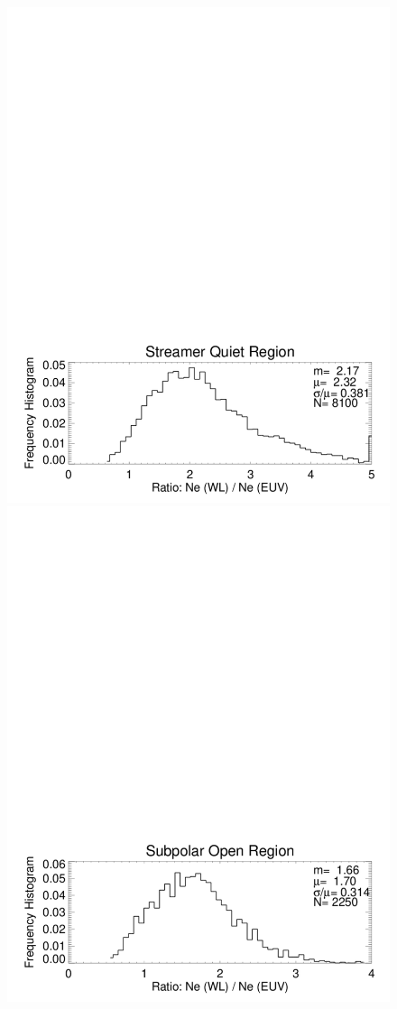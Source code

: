 \documentclass[baaa]{baaa}
\begin{document}
\begin{figure}[!ht]
  \centering
  \includegraphics[width=\columnwidth]{comparison_quiet_region_039_bloqueados.pdf}
  \includegraphics[width=\columnwidth]{comparison_open_region_039_bloqueados.pdf}\\

\end{figure}
\end{document}
